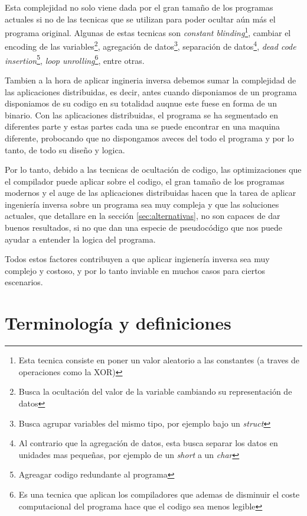 Esta complejidad no solo viene dada por el gran tamaño de los programas actuales si no de las tecnicas que se utilizan para poder ocultar aún más el programa original. Algunas
de estas tecnicas son \textit{constant blinding}\footnote{Esta tecnica consiste en poner un valor aleatorio a las constantes (a traves de operaciones como la XOR)}, cambiar el 
encoding de las variables\footnote{Busca la ocultación del valor de la variable cambiando su representación de datos}, agregación de datos\footnote{Busca agrupar variables del mismo
tipo, por ejemplo bajo un \textit{struct}}, separación de datos\footnote{Al contrario que la agregación de datos, esta busca separar los datos en unidades mas pequeñas, por ejemplo
de un \textit{short} a un \textit{char}}, \textit{dead code insertion}\footnote{Agreagar codigo redundante al programa}, \textit{loop unrolling}\footnote{Es una tecnica que aplican
los compiladores que ademas de disminuir el coste computacional del programa hace que el codigo sea menos legible}, entre otras. \cite{TecnicasIlegibleBinario}

Tambien a la hora de aplicar ingineria inversa debemos sumar la complejidad de las aplicaciones distribuidas, es decir, antes cuando disponiamos de un programa disponiamos de su
codigo en su totalidad auqnue este fuese en forma de un binario. Con las aplicaciones distribuidas, el programa se ha segmentado en diferentes parte y estas partes cada una se
puede encontrar en una maquina diferente, probocando que no dispongamos aveces del todo el programa y por lo tanto, de todo su diseño y logica.

Por lo tanto, debido a las tecnicas de ocultación de codigo, las optimizaciones que el compilador puede aplicar sobre el codigo, el gran tamaño de los programas modernos y el auge
de las aplicaciones distribuidas hacen que la tarea de aplicar ingeniería inversa sobre un programa sea muy compleja y que las soluciones actuales, que detallare en la sección
\ref{sec:alternativas}, no son capaces de dar buenos resultados, si no que dan una especie de pseudocódigo que nos puede ayudar a entender la logica del programa.

Todos estos factores contribuyen a que aplicar ingienería inversa sea muy complejo y costoso, y por lo tanto inviable en muchos casos para ciertos escenarios.

\section{Terminología y definiciones}
\label{sec:terminalogia}


